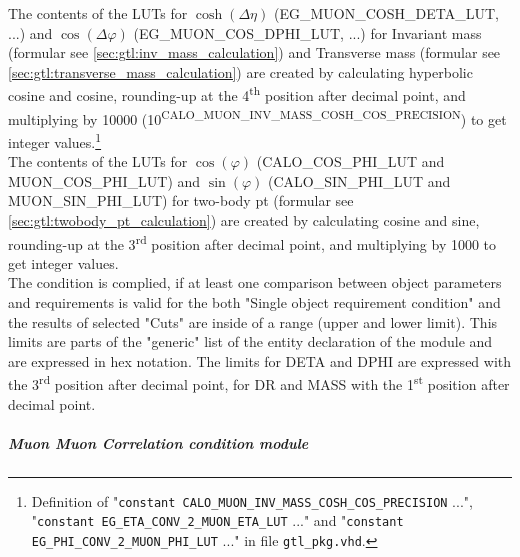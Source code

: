 The contents of the LUTs for $\cosh(\Delta\eta)$ (\small{EG\_MUON\_COSH\_DETA\_LUT}\normalsize, ...) and $\cos(\Delta\varphi)$ (\small{EG\_MUON\_COS\_DPHI\_LUT}\normalsize, ...) for Invariant mass
(formular see \ref{sec:gtl:inv_mass_calculation}) and Transverse mass (formular see \ref{sec:gtl:transverse_mass_calculation}) are created by calculating hyperbolic cosine and cosine, 
rounding-up at the 4\textsuperscript{th} position after decimal point, and multiplying by 10000
(10\textsuperscript{\tiny{CALO\_MUON\_INV\_MASS\_COSH\_COS\_PRECISION}}\normalsize) to get integer values.\footnote{Definition of "\texttt{constant \small{CALO\_MUON\_INV\_MASS\_COSH\_COS\_PRECISION}\normalsize} ...",
"\texttt{constant \small{EG\_ETA\_CONV\_2\_MUON\_ETA\_LUT}\normalsize} ..." and "\texttt{constant \small{EG\_PHI\_CONV\_2\_MUON\_PHI\_LUT}\normalsize} ..." in file \texttt{gtl\_pkg.vhd}.}\\
The contents of the LUTs for $\cos(\varphi)$ (\small{CALO\_COS\_PHI\_LUT and MUON\_COS\_PHI\_LUT}\normalsize) and $\sin(\varphi)$ (\small{CALO\_SIN\_PHI\_LUT and MUON\_SIN\_PHI\_LUT}\normalsize) for two-body pt 
(formular see \ref{sec:gtl:twobody_pt_calculation}) are created by calculating cosine and sine, rounding-up at the 3\textsuperscript{rd} position after decimal point,
and multiplying by 1000 to get integer values.\\
The condition is complied, if at least one comparison between object parameters and requirements is valid for the both "Single object requirement condition" and the results of selected "Cuts" are inside of
a range (upper and lower limit). This limits are parts of the "generic" list of the entity declaration of the module and are expressed in hex notation. The limits for DETA and DPHI
are expressed with the 3\textsuperscript{rd} position after decimal point, for DR and MASS with the 1\textsuperscript{st} position after decimal point.

\subparagraph{Muon Muon Correlation condition module}
\label{sec:gtl:muon_muon_correlation_condition_module}


